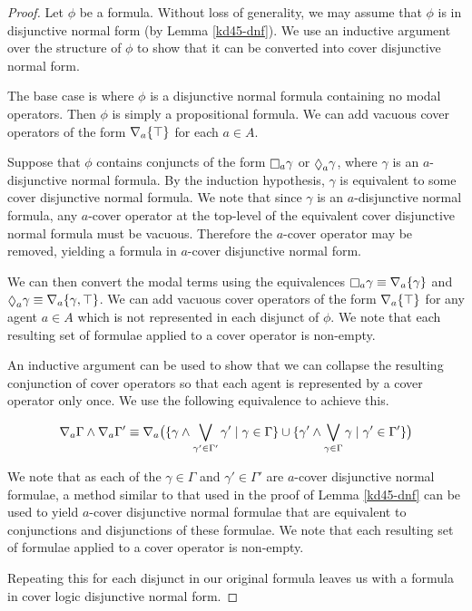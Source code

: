 \begin{proof}
Let $\phi$ be a \logicKD{} formula.  Without loss of generality, we may assume
that $\phi$ is in disjunctive normal form (by Lemma \ref{kd45-dnf}). We use an
inductive argument over the structure of $\phi$ to show that it can be converted
into cover disjunctive normal form.

The base case is where $\phi$ is a disjunctive normal formula containing no
modal operators. Then $\phi$ is simply a propositional formula. We can add
vacuous cover operators of the form $\nabla_a \{\top\}$ for each $a \in A$.

Suppose that $\phi$ contains conjuncts of the form $\knows_a \gamma$ or
$\suspects_a \gamma$, where $\gamma$ is an $a$-disjunctive normal formula. By
the induction hypothesis, $\gamma$ is equivalent to some cover disjunctive
normal formula. We note that since $\gamma$ is an $a$-disjunctive normal
formula, any $a$-cover operator at the top-level of the equivalent cover
disjunctive normal formula must be vacuous. Therefore the $a$-cover operator may
be removed, yielding a formula in $a$-cover disjunctive normal form.

We can then convert the modal terms using the equivalences $\knows_a \gamma
\equiv \covers_a \{\gamma\}$ and $\suspects_a \gamma \equiv \covers_a \{\gamma,
\top\}$. We can add vacuous cover operators of the form $\nabla_a \{\top\}$ for
any agent $a \in A$ which is not represented in each disjunct of $\phi$. We
note that each resulting set of formulae applied to a cover operator is
non-empty.

An inductive argument can be used to show that we can collapse the resulting
conjunction of cover operators so that each agent is represented by a cover
operator only once. We use the following equivalence to achieve this.

$$
\nabla_a \Gamma \land \nabla_a \Gamma' \equiv 
\nabla_a \big( 
\{ \gamma \land \bigvee_{\gamma' \in \Gamma'} \gamma' \mid \gamma \in \Gamma \}
\cup
\{ \gamma' \land \bigvee_{\gamma \in \Gamma} \gamma \mid \gamma' \in \Gamma' \}
\big)
$$

We note that as each of the $\gamma \in \Gamma$ and $\gamma' \in \Gamma'$ are
$a$-cover disjunctive normal formulae, a method similar to that used in the
proof of Lemma \ref{kd45-dnf} can be used to yield $a$-cover disjunctive normal
formulae that are equivalent to conjunctions and disjunctions of these formulae.
We note that each resulting set of formulae applied to a cover operator is
non-empty.

Repeating this for each disjunct in our original formula leaves us with a
formula in cover logic disjunctive normal form.
\end{proof}

